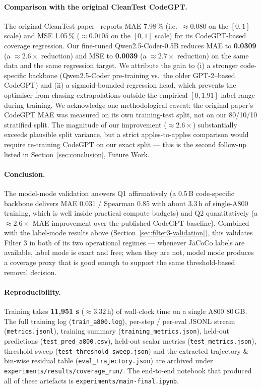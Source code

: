 \documentclass[acmlarge,nonacm,screen]{acmart}
\begin{document}
\paragraph{Comparison with the original CleanTest CodeGPT.}
The original CleanTest paper~\cite{zhang2025cleantest} reports
MAE 7.98\,\% (i.e.\ $\approx 0.080$ on the $[0, 1]$ scale) and
MSE 1.05\,\% ($\approx 0.0105$ on the $[0, 1]$ scale)
for its CodeGPT-based coverage regression. Our fine-tuned
Qwen2.5-Coder-0.5B reduces MAE to \textbf{0.0309} (a $\approx 2.6\times$
reduction) and MSE to \textbf{0.0039} (a $\approx 2.7\times$
reduction) on the same data and the same regression target. We
attribute the gain to (i) a stronger code-specific backbone
(Qwen2.5-Coder pre-training vs.\ the older GPT-2--based CodeGPT)
and (ii) a sigmoid-bounded regression head, which prevents the
optimiser from chasing extrapolations outside the empirical
$[0, 1.91]$ label range during training. We acknowledge one
methodological caveat: the original paper's CodeGPT MAE was
measured on its own training-test split, not on our 80/10/10
stratified split. The magnitude of our improvement
($\approx 2.6\times$) substantially exceeds plausible split
variance, but a strict apples-to-apples comparison would require
re-training CodeGPT on our exact split --- this is the second
follow-up listed in Section~\ref{sec:conclusion}, Future Work.

\paragraph{Conclusion.}
The model-mode validation answers Q1 affirmatively (a 0.5\,B
code-specific backbone delivers MAE 0.031 / Spearman 0.85 with
about 3.3\,h of single-A800 training, which is well inside
practical compute budgets) and Q2 quantitatively (a
$\approx 2.6\times$ MAE improvement over the published CodeGPT
baseline). Combined with the label-mode results above
(Section~\ref{sec:filter3-validation}), this validates Filter 3
in both of its two operational regimes --- whenever JaCoCo
labels are available, label mode is exact and free; when they are
not, model mode produces a coverage proxy that is good enough to
support the same threshold-based removal decision.

\paragraph{Reproducibility.} Training takes
\textbf{11{,}951 s} ($\approx 3.32$\,h) of wall-clock time on a
single A800 80\,GB. The full training log
(\texttt{train\_a800.log}), per-step / per-eval JSONL stream
(\texttt{metrics.jsonl}), training summary
(\texttt{training\_metrics.json}), held-out predictions
(\texttt{test\_pred\_a800.csv}), held-out scalar metrics
(\texttt{test\_metrics.json}), threshold sweep
(\texttt{test\_threshold\_sweep.json}) and the extracted trajectory
\& bin-wise residual table (\texttt{eval\_trajectory.json}) are
archived under \texttt{experiments/results/coverage\_run/}. The
end-to-end notebook that produced all of these artefacts is
\texttt{experiments/main-final.ipynb}.
\end{document}
